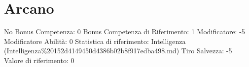 \section{Arcano}\label{arcano}

\begin{description}
\tightlist
\item[Tags: ABI]
No Bonus Competenza: 0 Bonus Competenza di Riferimento: 1 Modificatore:
-5 Modificatore Abilità: 0 Statistica di riferimento: Intelligenza
(Intelligenza\%20152d4149450d4386b02b8f917edba498.md) Tiro Salvezza: -5
Valore di riferimento: 0
\end{description}
